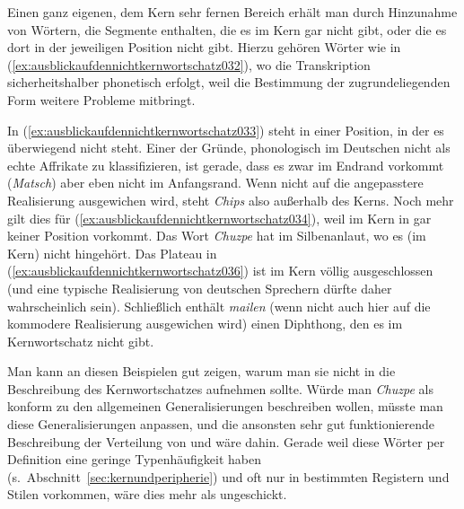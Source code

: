 Einen ganz eigenen, dem Kern sehr fernen Bereich erhält man durch Hinzunahme von Wörtern, die Segmente enthalten, die es im Kern gar nicht gibt, oder die es dort in der jeweiligen Position nicht gibt.
Hierzu gehören Wörter wie in (\ref{ex:ausblickaufdennichtkernwortschatz032}), wo die Transkription sicherheitshalber phonetisch erfolgt, weil die Bestimmung der zugrundeliegenden Form weitere Probleme mitbringt.

\begin{exe}
  \ex\label{ex:ausblickaufdennichtkernwortschatz032}
  \begin{xlist}
  \end{xlist}
\end{exe}

In (\ref{ex:ausblickaufdennichtkernwortschatz033}) steht \textipa{[\t{tS}]} in einer Position, in der es überwiegend nicht steht.
Einer der Gründe, phonologisch \textipa{[\t{tS}]} im Deutschen nicht als echte Affrikate zu klassifizieren, ist gerade, dass es zwar im Endrand vorkommt (\textit{Matsch}) aber eben nicht im Anfangsrand.
Wenn nicht auf die angepasstere Realisierung \textipa{[SIps]} ausgewichen wird, steht \textit{Chips} also außerhalb des Kerns.
Noch mehr gilt dies für (\ref{ex:ausblickaufdennichtkernwortschatz034}), weil \textipa{[\t{dZ}]} im Kern in gar keiner Position vorkommt.
Das Wort \textit{Chuzpe} hat \textipa{[X]} im Silbenanlaut, wo es (im Kern) nicht hingehört.
Das Plateau \textipa{[pt]} in (\ref{ex:ausblickaufdennichtkernwortschatz036}) ist im Kern völlig ausgeschlossen (und eine typische Realisierung von deutschen Sprechern dürfte daher wahrscheinlich \textipa{[p@tEKanodOn]} sein).
Schließlich enthält \textit{mailen} (wenn nicht auch hier auf die kommodere Realisierung \textipa{[me:l@n]} ausgewichen wird) einen Diphthong, den es im Kernwortschatz nicht gibt.

Man kann an diesen Beispielen gut zeigen, warum man sie nicht in die Beschreibung des Kernwortschatzes aufnehmen sollte.
Würde man \textit{Chuzpe} \zB als konform zu den allgemeinen Generalisierungen beschreiben wollen, müsste man diese Generalisierungen anpassen, und die ansonsten sehr gut funktionierende Beschreibung der Verteilung von \textipa{[\c{c}]} und \textipa{[X]} wäre dahin.
Gerade weil diese Wörter per Definition eine geringe Typenhäufigkeit haben (s.\ Abschnitt~\ref{sec:kernundperipherie}) und oft nur in bestimmten Registern und Stilen vorkommen, wäre dies mehr als ungeschickt.

